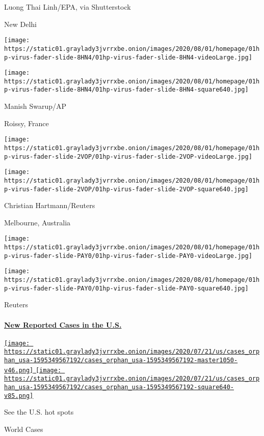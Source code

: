  Luong Thai Linh/EPA, via Shutterstock

New Delhi

\texttt{[image: https://static01.graylady3jvrrxbe.onion/images/2020/08/01/homepage/01hp-virus-fader-slide-8HN4/01hp-virus-fader-slide-8HN4-videoLarge.jpg]}

\texttt{[image: https://static01.graylady3jvrrxbe.onion/images/2020/08/01/homepage/01hp-virus-fader-slide-8HN4/01hp-virus-fader-slide-8HN4-square640.jpg]}

 Manish Swarup/AP

Roissy, France

\texttt{[image: https://static01.graylady3jvrrxbe.onion/images/2020/08/01/homepage/01hp-virus-fader-slide-2VOP/01hp-virus-fader-slide-2VOP-videoLarge.jpg]}

\texttt{[image: https://static01.graylady3jvrrxbe.onion/images/2020/08/01/homepage/01hp-virus-fader-slide-2VOP/01hp-virus-fader-slide-2VOP-square640.jpg]}

 Christian Hartmann/Reuters

Melbourne, Australia

\texttt{[image: https://static01.graylady3jvrrxbe.onion/images/2020/08/01/homepage/01hp-virus-fader-slide-PAY0/01hp-virus-fader-slide-PAY0-videoLarge.jpg]}

\texttt{[image: https://static01.graylady3jvrrxbe.onion/images/2020/08/01/homepage/01hp-virus-fader-slide-PAY0/01hp-virus-fader-slide-PAY0-square640.jpg]}

 Reuters

\hypertarget{new-reported-cases-in-the-us}{%
\paragraph{\texorpdfstring{\href{https://www.nytimes3xbfgragh.onion/interactive/2020/us/coronavirus-us-cases.html}{New
Reported Cases in the
U.S.}}{New Reported Cases in the U.S.}}\label{new-reported-cases-in-the-us}}

\href{https://www.nytimes3xbfgragh.onion/interactive/2020/us/coronavirus-us-cases.html}{\texttt{[image: https://static01.graylady3jvrrxbe.onion/images/2020/07/21/us/cases\_orphan\_usa-1595349567192/cases\_orphan\_usa-1595349567192-master1050-v46.png]}
\texttt{[image: https://static01.graylady3jvrrxbe.onion/images/2020/07/21/us/cases\_orphan\_usa-1595349567192/cases\_orphan\_usa-1595349567192-square640-v85.png]}}

See the U.S. hot spots

World Cases

